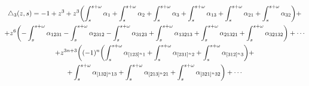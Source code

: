 \begin{lem}


\begin{multline}


\tri_3(z,s)=-1+z^3+z^3\biggl(\int_s^{s+\omega}\alpha_1+


\int_s^{s+\omega}\alpha_2+


\int_s^{s+\omega}\alpha_3+\int_s^{s+\omega}\alpha_{13}+


\int_s^{s+\omega}\alpha_{21}+


\int_s^{s+\omega}\alpha_{32}\biggr)+\\


%


+z^6\biggl(-\int_s^{s+\omega}\alpha_{1231}-\int_s^{s+\omega}\alpha_{2312}-


\int_s^{s+\omega}\alpha_{3123}


+\int_s^{s+\omega}\alpha_{13213}+\int_s^{s+\omega}\alpha_{21321}+


\int_s^{s+\omega}\alpha_{32132}\biggr)


+\dotsb\\


%


+z^{3n+3}\biggl((-1)^n\biggl(\int_s^{s+\omega}\alpha_{[123]^n1}+


\int_s^{s+\omega}\alpha_{[231]^n2}+


\int_s^{s+\omega}\alpha_{[312]^n3}\biggr)+\\


%


+\int_s^{s+\omega}\alpha_{[132]^n13}+\int_s^{s+\omega}\alpha_{[213]^n21}+


\int_s^{s+\omega}\alpha_{[321]^n32}\biggr)


+\dotsb


\end{multline}


\end{lem}





